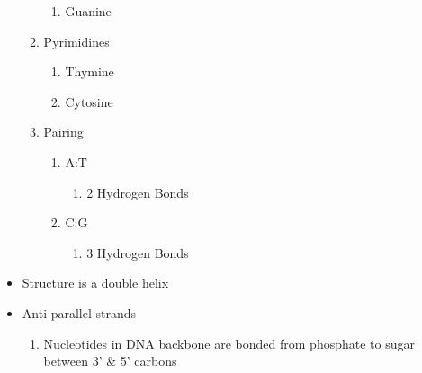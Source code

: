 \documentclass[12pt]{article}
\begin{document}
\begin{itemize}
\begin{enumerate}
\begin{enumerate}
          \item Guanine

        \end{enumerate}

      \item Pyrimidines

        \begin{enumerate}

          \item Thymine

          \item Cytosine

        \end{enumerate}

      \item Pairing

        \begin{enumerate}

          \item A:T

            \begin{enumerate}

              \item 2 Hydrogen Bonds

            \end{enumerate}

          \item C:G

            \begin{enumerate}

              \item 3 Hydrogen Bonds

            \end{enumerate}

        \end{enumerate}

    \end{enumerate}

  \item Structure is a double helix

  \item Anti-parallel strands

    \begin{enumerate}

      \item Nucleotides in DNA backbone are bonded from phosphate to sugar between 3' \& 5' carbons

        \begin{enumerate}


\end{enumerate}
\end{enumerate}
\end{itemize}
\end{document}
